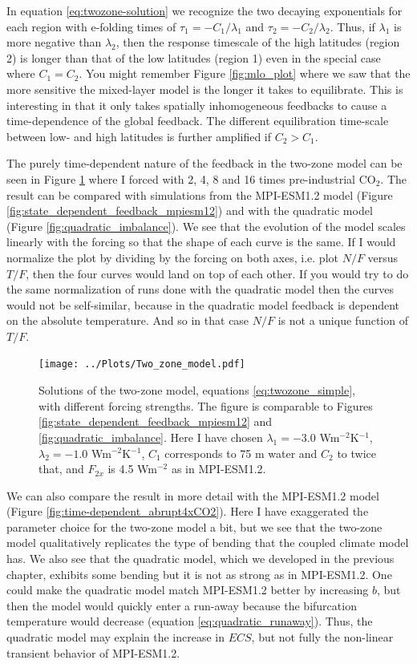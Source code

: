 \documentclass[12pt]{book}
\begin{document}
In equation \ref{eq:twozone-solution} we recognize the two decaying exponentials for each region with e-folding times of $\tau_1=-C_1/\lambda_1$ and $\tau_2=-C_2/\lambda_2$. Thus, if $\lambda_1$ is more negative than $\lambda_2$, then the response timescale of the high latitudes (region 2) is longer than that of the low latitudes (region 1) even in the special case where $C_1=C_2$. You might remember Figure \ref{fig:mlo_plot} where we saw that the more sensitive the mixed-layer model is the longer it takes to equilibrate. This is interesting in that it only takes spatially inhomogeneous feedbacks to cause a time-dependence of the global feedback. The different equilibration time-scale between low- and high latitudes is further amplified if $C_2 > C_1$. 

The purely time-dependent nature of the feedback in the two-zone model can be seen in Figure \ref{fig:two-zone-model} where I forced with 2, 4, 8 and 16 times pre-industrial CO$_2$.  The result can be compared with simulations from the MPI-ESM1.2 model (Figure \ref{fig:state_dependent_feedback_mpiesm12}) and with the quadratic model (Figure \ref{fig:quadratic_imbalance}). We see that the evolution of the model scales linearly with the forcing so that the shape of each curve is the same. If I would normalize the plot by dividing by the forcing on both axes, i.e. plot $N/F$ versus $T/F$, then the four curves would land on top of each other. If you would try to do the same normalization of runs done with the quadratic model then the curves would not be self-similar, because in the quadratic model feedback is dependent on the absolute temperature. And so in that case $N/F$ is not a unique function of $T/F$. 

\begin{figure}
\begin{center}
\texttt{[image: ../Plots/Two\_zone\_model.pdf]}
\end{center}
\caption{ Solutions of the two-zone model, equations \ref{eq:twozone_simple}, with different forcing strengths. The figure is comparable to Figures \ref{fig:state_dependent_feedback_mpiesm12} and \ref{fig:quadratic_imbalance}. Here I have chosen $\lambda_1 = -3.0$ Wm$^{-2}$K$^{-1}$, $\lambda_2 = -1.0$ Wm$^{-2}$K$^{-1}$, $C_1$ corresponds to 75 m water and $C_2$ to twice that, and $F_{2x}$ is 4.5 Wm$^{-2}$ as in MPI-ESM1.2. } 
\label{fig:two-zone-model}
\end{figure}

We can also compare the result in more detail with the MPI-ESM1.2 model (Figure \ref{fig:time-dependent_abrupt4xCO2}). Here I have exaggerated the parameter choice for the two-zone model a bit, but we see that the two-zone model qualitatively replicates the type of bending that the coupled climate model has. We also see that the quadratic model, which we developed in the previous chapter, exhibits some bending but it is not as strong as in MPI-ESM1.2. One could make the quadratic model match MPI-ESM1.2 better by increasing $b$, but then the model would quickly enter a run-away because the bifurcation temperature would decrease (equation \ref{eq:quadratic_runaway}). Thus, the quadratic model may explain the increase in $ECS$, but not fully the non-linear transient behavior of MPI-ESM1.2. 
\end{document}
